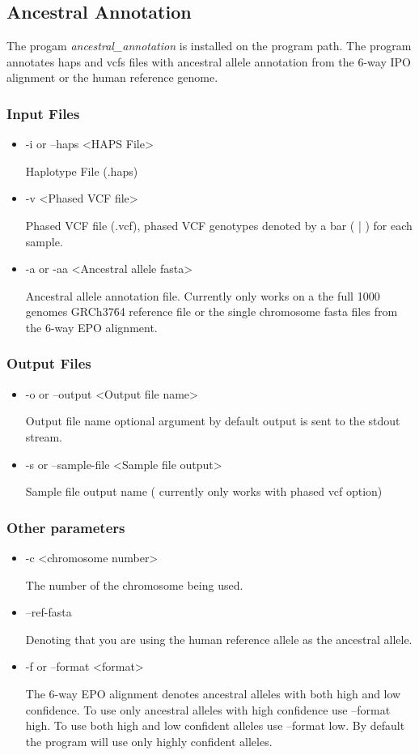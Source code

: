 \subsection{Ancestral Annotation}
The progam \emph{ancestral\_annotation} is installed on the program path. The program annotates haps and vcfs files with ancestral allele annotation from the 6-way IPO alignment or the human reference genome.
\subsubsection{Input Files}
\begin{itemize}
\item -i or --haps <HAPS File>

Haplotype File (.haps)

\item -v <Phased VCF file>

Phased VCF file (.vcf), phased VCF genotypes denoted by a bar ( | ) for each sample.
\item -a or -aa <Ancestral allele fasta>

Ancestral allele annotation file. Currently only works on a the full 1000 genomes GRCh37\.64 reference file or the single chromosome fasta files from the 6-way EPO alignment.
\end{itemize}
\subsubsection{Output Files}
\begin{itemize}
\item -o or --output <Output file name>

Output file name optional argument by default output is sent to the stdout stream.

\item -s or --sample-file <Sample file output>

Sample file output name ( currently only works with phased vcf option)
\end{itemize}
\subsubsection{Other parameters}
\begin{itemize}
\item -c <chromosome number>

The number of the chromosome being used.

\item --ref-fasta

Denoting that you are using the human reference allele as the ancestral allele. 
\item -f or --format <format>

The 6-way EPO alignment denotes ancestral alleles with both high and low confidence. To use only ancestral alleles with high confidence use --format high. To use both high and low confident alleles use --format low. By default the program will use only highly confident alleles.
\end{itemize}
